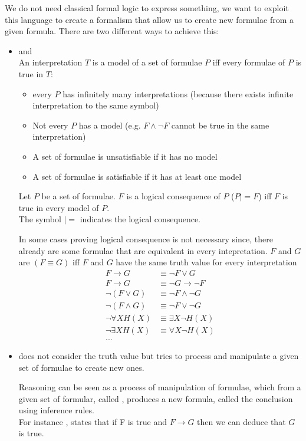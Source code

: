 We do not need classical formal logic to express something, we want to exploit this language to create a formalism that allow us to create new formulae from a given formula. There are two different ways to achieve this:
\begin{itemize}
\item {} and \\
An interpretation $T$ is a model of a set of formulae $P$ iff every formulae of $P$ is true in $T$:
\begin{itemize}
\item every $P$ has infinitely many interpretations (because there exists infinite interpretation to the same symbol)
\item Not every $P$ has a model (e.g. $F \land \neg F$ cannot be true in the same interpretation)
\item A set of formulae is unsatisfiable if it has no model
\item A set of formulae is satisfiable if it has at least one model
\end{itemize}

Let $P$ be a set of formulae. $F$ is a logical consequence of $P$ ($P|=F$) iff $F$ is true in every model of $P$.\\
The symbol $|= $ indicates the logical consequence.

In some cases proving logical consequence is not necessary since, there already are some formulae that are equivalent in every intepretation. 
$F$ and $G$ are  $(F \equiv G)$ iff $F$ and $G$ have the same truth value for every interpretation
\begin{align*}
F\rightarrow G &\equiv \neg F \lor G \\
F \rightarrow G &\equiv \neg G \rightarrow \neg F\\
\neg ( F\lor G) &\equiv \neg F \land \neg G\\
\neg ( F\land G) &\equiv \neg F \lor \neg G\\
\neg \forall X H(X) &\equiv \exists X \neg H(X)\\
\neg \exists X H(X) &\equiv \forall X \neg H(X)\\
...
\end{align*}
\item {} does not consider the truth value but tries to process and manipulate a given set of formulae to create new ones.

Reasoning can be seen as a process of manipulation of formulae, which from a given set of formular, called , produces a new formula, called the conclusion using inference rules.\\
For instance , states that if F is true and $F\rightarrow G$ then we can deduce that $G$ is true.


\end{itemize}
